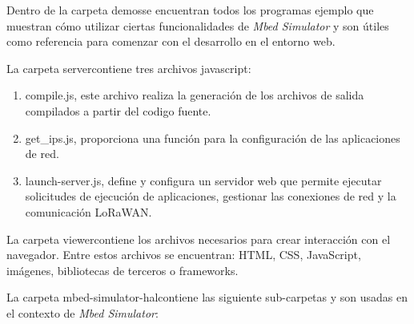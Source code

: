 Dentro de la carpeta \textquotedbl demos\textquotedbl se encuentran todos los programas ejemplo que muestran cómo utilizar ciertas funcionalidades de \textit{Mbed Simulator} y son útiles como referencia para comenzar con el desarrollo en el entorno web. 
 
La carpeta \textquotedbl server\textquotedbl contiene tres archivos javascript: 

\begin{enumerate}
	\item compile.js, este archivo realiza la generación de los archivos de salida compilados a partir del codigo fuente.
	
	\item get\_ips.js, proporciona una función para la configuración de las aplicaciones de red.

	\item launch-server.js, define y configura un servidor web que permite ejecutar solicitudes de ejecución de aplicaciones, gestionar las conexiones de red y la comunicación LoRaWAN.
	
\end{enumerate}
 
La carpeta \textquotedbl viewer\textquotedbl contiene los archivos necesarios para crear interacción con el navegador. Entre estos archivos se encuentran: HTML, CSS, JavaScript, imágenes, bibliotecas de terceros o frameworks.
 
La carpeta \textquotedbl mbed-simulator-hal\textquotedbl contiene las siguiente sub-carpetas y son usadas en el contexto de \textit{Mbed Simulator}: 

